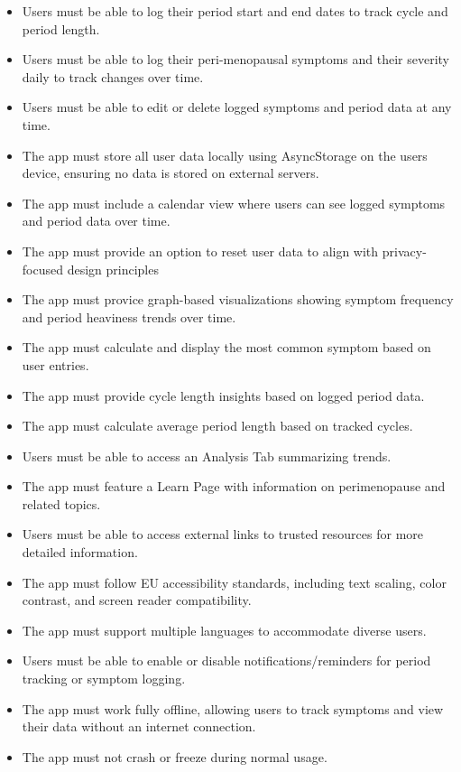 \begin{itemize}
      \item Users must be able to log their period start and end dates to track cycle and period length.
      \item Users must be able to log their peri-menopausal symptoms and their severity daily to track changes over time.
      \item Users must be able to edit or delete logged symptoms and period data at any time.
      \item The app must store all user data locally using AsyncStorage on the users device, ensuring no data is stored on external servers.
      \item The app must include a calendar view where users can see logged symptoms and period data over time.
      \item The app must provide an option to reset user data to align with privacy-focused design principles
      \item The app must provice graph-based visualizations showing symptom frequency and period heaviness trends over time.
      \item The app must calculate and display the most common symptom based on user entries.
      \item The app must provide cycle length insights based on logged period data.
      \item The app must calculate average period length based on tracked cycles.
      \item Users must be able to access an Analysis Tab summarizing trends.
      \item The app must feature a Learn Page with information on perimenopause and related topics.
      \item Users must be able to access external links to trusted resources for more detailed information.
      \item The app must follow EU accessibility standards, including text scaling, color contrast, and screen reader compatibility.
      \item The app must support multiple languages to accommodate diverse users.
      \item Users must be able to enable or disable notifications/reminders for period tracking or symptom logging.
      \item The app must work fully offline, allowing users to track symptoms and view their data without an internet connection.
      \item The app must not crash or freeze during normal usage.
\end{itemize}

